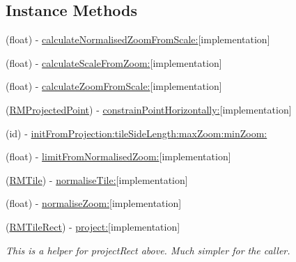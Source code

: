 \subsection*{Instance Methods}
\begin{DoxyCompactItemize}
\item 
(float) -\/ \hyperlink{interface_r_m_fractal_tile_projection_a6432f229f4cfabfba65b7b702d0eb96c}{calculate\-Normalised\-Zoom\-From\-Scale\-:}{\ttfamily  \mbox{[}implementation\mbox{]}}
\item 
(float) -\/ \hyperlink{interface_r_m_fractal_tile_projection_aea5d9c0bdb2b6eb460d9882d6b2a46ec}{calculate\-Scale\-From\-Zoom\-:}{\ttfamily  \mbox{[}implementation\mbox{]}}
\item 
(float) -\/ \hyperlink{interface_r_m_fractal_tile_projection_a8604a8779fd50182367c0b176bd5a2ec}{calculate\-Zoom\-From\-Scale\-:}{\ttfamily  \mbox{[}implementation\mbox{]}}
\item 
(\hyperlink{struct_r_m_projected_point}{R\-M\-Projected\-Point}) -\/ \hyperlink{interface_r_m_fractal_tile_projection_a8e18cdf789364738340b838bf0638185}{constrain\-Point\-Horizontally\-:}{\ttfamily  \mbox{[}implementation\mbox{]}}
\item 
(id) -\/ \hyperlink{interface_r_m_fractal_tile_projection_af734f3ef032f0eacc03d35b3dc6dbbea}{init\-From\-Projection\-:tile\-Side\-Length\-:max\-Zoom\-:min\-Zoom\-:}
\item 
(float) -\/ \hyperlink{interface_r_m_fractal_tile_projection_abdf987db026c7761e2f57b0ea8207464}{limit\-From\-Normalised\-Zoom\-:}{\ttfamily  \mbox{[}implementation\mbox{]}}
\item 
(\hyperlink{struct_r_m_tile}{R\-M\-Tile}) -\/ \hyperlink{interface_r_m_fractal_tile_projection_a6ab9f21ef545dbac3647001f64022335}{normalise\-Tile\-:}{\ttfamily  \mbox{[}implementation\mbox{]}}
\item 
(float) -\/ \hyperlink{interface_r_m_fractal_tile_projection_a08e53c12b44631258e909dbc33385c96}{normalise\-Zoom\-:}{\ttfamily  \mbox{[}implementation\mbox{]}}
\item 
(\hyperlink{struct_r_m_tile_rect}{R\-M\-Tile\-Rect}) -\/ \hyperlink{interface_r_m_fractal_tile_projection_a76f6d1fea39a1c577ff0b26012b05c9c}{project\-:}{\ttfamily  \mbox{[}implementation\mbox{]}}
\begin{DoxyCompactList}\small\item\em This is a helper for project\-Rect above. Much simpler for the caller. \end{DoxyCompactList}\item 

\end{DoxyCompactItemize}
